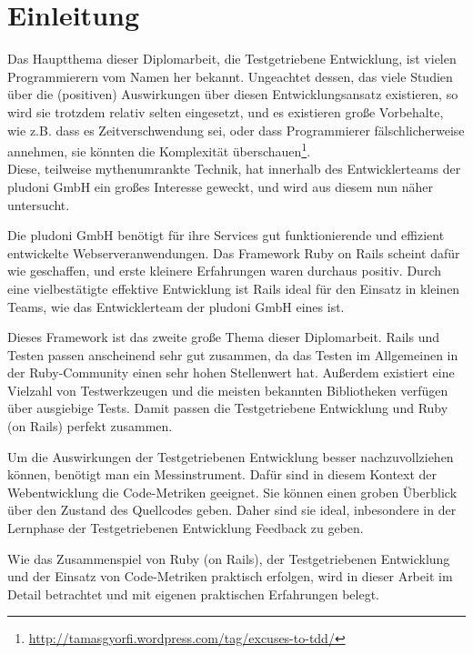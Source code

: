 

\chapter{Einleitung}

Das Hauptthema dieser Diplomarbeit, die Testgetriebene Entwicklung, ist vielen Programmierern vom Namen her bekannt. Ungeachtet dessen, das  viele Studien über die (positiven) Auswirkungen über diesen Entwicklungsansatz  existieren, so wird sie trotzdem relativ selten eingesetzt, und es existieren große Vorbehalte, wie z.B. dass es Zeitverschwendung sei, oder dass Programmierer fälschlicherweise annehmen, sie könnten die Komplexität überschauen\footnote{\url{http://tamasgyorfi.wordpress.com/tag/excuses-to-tdd/}}.\\
Diese, teilweise mythenumrankte Technik, hat innerhalb des Entwicklerteams der pludoni GmbH ein großes Interesse geweckt, und wird aus diesem nun näher untersucht.

Die pludoni GmbH benötigt für ihre Services gut funktionierende und effizient entwickelte Webserveranwendungen. Das Framework Ruby on Rails scheint dafür wie geschaffen, und erste kleinere Erfahrungen waren durchaus positiv. Durch eine vielbestätigte effektive Entwicklung ist Rails ideal für den Einsatz in kleinen Teams, wie das Entwicklerteam der pludoni GmbH eines ist.

Dieses Framework  ist das zweite große Thema dieser Diplomarbeit. Rails und Testen passen anscheinend sehr gut zusammen, da das Testen im Allgemeinen in der Ruby-Community einen sehr hohen Stellenwert hat. Außerdem existiert eine Vielzahl von Testwerkzeugen und die meisten bekannten Bibliotheken verfügen über ausgiebige Tests. Damit passen die Testgetriebene Entwicklung und Ruby (on Rails) perfekt zusammen.

Um die Auswirkungen der Testgetriebenen Entwicklung besser nachzuvollziehen können, benötigt man ein Messinstrument. Dafür sind in diesem Kontext der Webentwicklung die Code-Metriken geeignet. Sie können einen groben Überblick über den Zustand des Quellcodes geben. Daher sind sie ideal, inbesondere in der Lernphase der Testgetriebenen Entwicklung Feedback zu geben.

Wie das Zusammenspiel von Ruby (on Rails), der Testgetriebenen Entwicklung und der Einsatz von Code-Metriken praktisch erfolgen, wird in dieser Arbeit im Detail betrachtet und mit eigenen praktischen Erfahrungen belegt.

